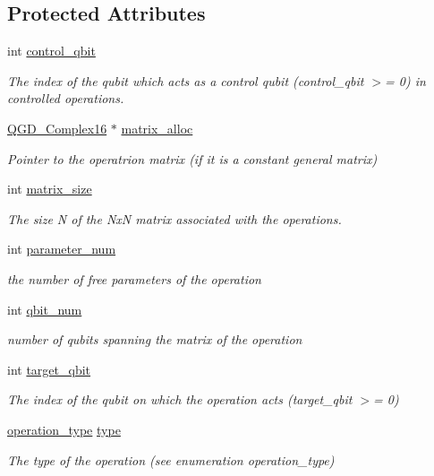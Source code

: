 \subsection*{Protected Attributes}
\begin{DoxyCompactItemize}
\item 
int \hyperlink{class_operation_a9a798ea8adec5a45fd2ca07996da88e1}{control\+\_\+qbit}
\begin{DoxyCompactList}\small\item\em The index of the qubit which acts as a control qubit (control\+\_\+qbit $>$= 0) in controlled operations. \end{DoxyCompactList}\item 
\hyperlink{struct_q_g_d___complex16}{Q\+G\+D\+\_\+\+Complex16} $\ast$ \hyperlink{class_operation_ade4d28d271ca13950d04363aac1c382e}{matrix\+\_\+alloc}
\begin{DoxyCompactList}\small\item\em Pointer to the operatrion matrix (if it is a constant general matrix) \end{DoxyCompactList}\item 
int \hyperlink{class_operation_a8236c07112cb165a00d3869363808624}{matrix\+\_\+size}
\begin{DoxyCompactList}\small\item\em The size N of the NxN matrix associated with the operations. \end{DoxyCompactList}\item 
int \hyperlink{class_operation_aa57505afe5b5ec27f6d053044b86e043}{parameter\+\_\+num}
\begin{DoxyCompactList}\small\item\em the number of free parameters of the operation \end{DoxyCompactList}\item 
int \hyperlink{class_operation_aecd5fbf1dd4ea532b2e58471ff8bad69}{qbit\+\_\+num}
\begin{DoxyCompactList}\small\item\em number of qubits spanning the matrix of the operation \end{DoxyCompactList}\item 
int \hyperlink{class_operation_a3e489b72c124b494777c71b1646bb1e9}{target\+\_\+qbit}
\begin{DoxyCompactList}\small\item\em The index of the qubit on which the operation acts (target\+\_\+qbit $>$= 0) \end{DoxyCompactList}\item 
\hyperlink{operations_2include_2_operation_8h_ad99e62941c8e4b13e5fc45ecaaf65eff}{operation\+\_\+type} \hyperlink{class_operation_ad47c56c86d62a4c775571e1600416479}{type}
\begin{DoxyCompactList}\small\item\em The type of the operation (see enumeration operation\+\_\+type) \end{DoxyCompactList}\end{DoxyCompactItemize}



